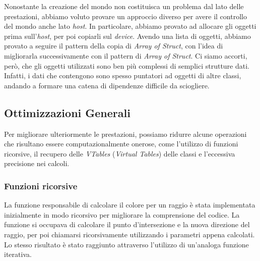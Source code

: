 \documentclass[main.tex]{subfiles}
\begin{document}

Nonostante la creazione del mondo non costituisca un problema dal lato delle prestazioni, abbiamo voluto provare un approccio diverso per avere il controllo del mondo anche lato \textit{host}. In particolare, abbiamo provato ad allocare gli oggetti prima sull'\textit{host}, per poi copiarli sul \textit{device}. Avendo una lista di oggetti, abbiamo provato a seguire il pattern della copia di \textit{Array of Struct}, con l'idea di migliorarla successivamente con il pattern di \textit{Array of Struct}. Ci siamo accorti, però, che gli oggetti utilizzati sono ben più complessi di semplici strutture dati. Infatti, i dati che contengono sono spesso puntatori ad oggetti di altre classi, andando a formare una catena di dipendenze difficile da sciogliere. 

\subsection{Ottimizzazioni Generali}
\hspace*{0.25in}Per migliorare ulteriormente le prestazioni, possiamo ridurre alcune operazioni che risultano essere computazionalmente onerose, come l'utilizzo di funzioni ricorsive, il recupero delle \textit{VTables} (\textit{Virtual Tables}) delle classi e l'eccessiva precisione nei calcoli. 

\subsubsection{Funzioni ricorsive}
La funzione responsabile di calcolare il colore per un raggio è stata implementata inizialmente in modo ricorsivo per migliorare la comprensione del codice. La funzione si occupava di calcolare il punto d'intersezione e la nuova direzione del raggio, per poi chiamarsi ricorsivamente utilizzando i parametri appena calcolati. Lo stesso risultato è stato raggiunto attraverso l'utilizzo di un'analoga funzione iterativa.
\end{document}

